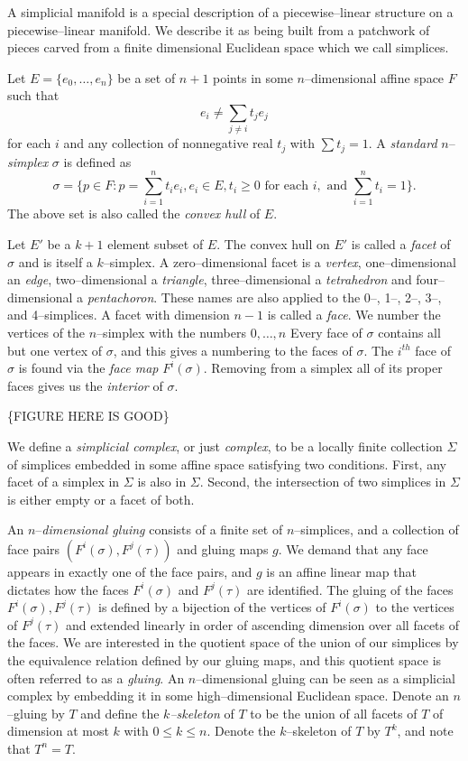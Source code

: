 A simplicial manifold is a special description of a piecewise--linear structure on a piecewise--linear manifold.
We describe it as being built from a patchwork of pieces carved from a finite dimensional Euclidean space which we call simplices.

Let $E=\{e_0,\dots,e_n\}$ be a set of $n+1$ points in some $n$--dimensional affine space $F$ such that
\[
  e_i\neq \sum_{j\neq i}t_j e_j
\]
for each $i$ and any collection of nonnegative real $t_j$ with $\sum t_j=1$.
A \emph{standard} $n$--\emph{simplex} $\sigma$ is defined as
\[
  \sigma = \{p\in F : p = \sum_{i=1}^n t_i e_i , e_i\in E, t_i\geq 0\text{ for each }i,\text{ and }\sum_{i=1}^n t_i=1\}.
\]
The above set is also called the \emph{convex hull} of $E$.

Let $E'$ be a $k+1$ element subset of $E$.
The convex hull on $E'$ is called a \emph{facet} of $\sigma$ and is itself a $k$--simplex.
A zero--dimensional facet is a \emph{vertex}, one--dimensional an \emph{edge}, two--dimensional a \emph{triangle}, three--dimensional a \emph{tetrahedron} and four--dimensional a \emph{pentachoron}.
These names are also applied to the 0--, 1--, 2--, 3--, and 4--simplices.
A facet with dimension $n-1$ is called a \emph{face}.
We number the vertices of the $n$--simplex with the numbers $0,\dots,n$
Every face of $\sigma$ contains all but one vertex of $\sigma$, and this gives a numbering to the faces of $\sigma$.
The $i^{th}$ face of $\sigma$ is found via the \emph{face map} $F^i(\sigma)$.
Removing from a simplex all of its proper faces gives us the \emph{interior} of $\sigma$.

\{FIGURE HERE IS GOOD\}

We define a \emph{simplicial complex}, or just \emph{complex}, to be a locally finite collection $\Sigma$ of simplices embedded in some affine space satisfying two conditions.
First, any facet of a simplex in $\Sigma$ is also in $\Sigma$.
Second, the intersection of two simplices in $\Sigma$ is either empty or a facet of both.

An $n$--\emph{dimensional gluing} consists of a finite set of $n$--simplices, and a collection of face pairs $(F^i(\sigma),F^j(\tau))$ and gluing maps $g$.
We demand that any face appears in exactly one of the face pairs, and $g$ is an affine linear map that dictates how the faces $F^i(\sigma)$ and $F^j(\tau)$ are identified.
The gluing of the faces $F^i(\sigma),F^j(\tau)$ is defined by a bijection of the vertices of $F^i(\sigma)$ to the vertices of $F^j(\tau)$ and extended linearly in order of ascending dimension over all facets of the faces.
We are interested in the quotient space of the union of our simplices by the equivalence relation defined by our gluing maps, and this quotient space is often referred to as a \emph{gluing}.
An $n$--dimensional gluing can be seen as a simplicial complex by embedding it in some high--dimensional Euclidean space.
Denote an $n$--gluing by $T$ and define the \emph{$k$--skeleton} of $T$ to be the union of all facets of $T$ of dimension at most $k$ with $0\leq k\leq n$.
Denote the $k$--skeleton of $T$ by $T^k$, and note that $T^n=T$.

